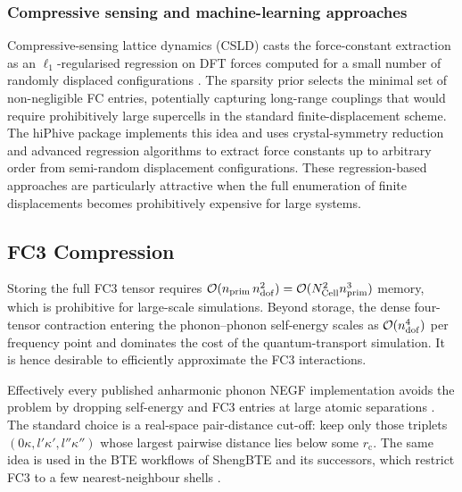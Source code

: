 \subsubsection{Compressive sensing and machine-learning approaches}
\label{ssub:csld_fc}
Compressive-sensing lattice dynamics (CSLD) casts the force-constant
extraction as an $\ell_1$-regularised regression on DFT forces
computed for a small number of randomly displaced configurations
\cite{zhou_lattice_2014, zhou_compressive_2019}.  The sparsity prior
selects the minimal set of non-negligible FC entries, potentially
capturing long-range couplings that would require prohibitively large
supercells in the standard finite-displacement scheme.  The hiPhive
package \cite{eriksson_hiphive_2019} implements this idea and uses
crystal-symmetry reduction and advanced regression
algorithms to extract force constants up to arbitrary order
from semi-random displacement configurations. These regression-based approaches are
particularly attractive when the full enumeration of finite
displacements becomes prohibitively expensive for large systems.

\subsection{FC3 Compression}
\label{sub:fc3_compression}

Storing the full FC3 tensor requires $\mathcal{O}(n_{\mathrm{prim}}\,n_{\mathrm{dof}}^{2}) = \mathcal{O}(N_{\mathrm{Cell}}^{2}n_{\mathrm{prim}}^{3})$
memory, which is prohibitive for large-scale simulations. Beyond storage, the dense four-tensor
contraction entering the phonon--phonon self-energy scales as $\mathcal{O}(n_{\mathrm{dof}}^{4})$ per frequency
point and dominates the cost of the quantum-transport simulation. It is hence desirable to
efficiently approximate the FC3 interactions.

Effectively every published anharmonic phonon NEGF implementation avoids the problem by
dropping self-energy and FC3 entries at large atomic separations
\cite{guo_quantum_2020, guo_anharmonic_2021, luisier_atomistic_2012, li_anharmonic_2009,
      polanco_nonequilibrium_2021, mingo_anharmonic_2006}.
The standard choice is a real-space pair-distance cut-off: keep only those triplets
$(0\kappa, l'\kappa', l''\kappa'')$ whose largest pairwise distance lies below some
$r_\mathrm{c}$. The same idea is used in the BTE workflows of ShengBTE and its successors,
which restrict FC3 to a few nearest-neighbour shells \cite{li_shengbte_2014}.

